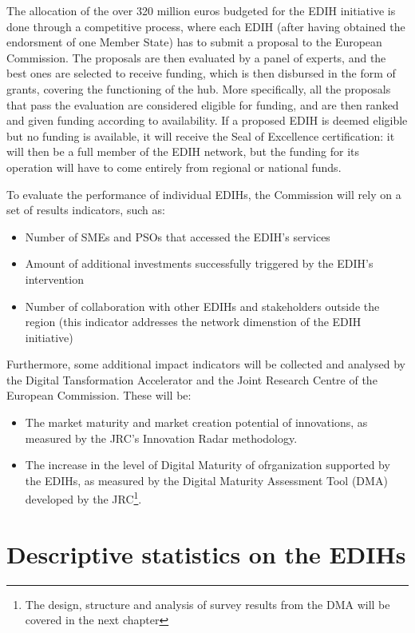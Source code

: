 \documentclass[12pt]{report}
\begin{document}
\par The allocation of the over 320 million euros budgeted for the EDIH initiative is done through a competitive process, where each EDIH (after having obtained the endorsment of one Member State) has to submit a proposal to the European Commission. The proposals are then evaluated by a panel of experts, and the best ones are selected to receive funding, which is then disbursed in the form of grants, covering the functioning of the hub. More specifically, all the proposals that pass the evaluation are considered eligible for funding, and are then ranked and given funding according to availability. If a proposed EDIH is deemed eligible but no funding is available, it will receive the Seal of Excellence certification: it will then be a full member of the EDIH network, but the funding for its operation will have to come entirely from regional or national funds.

\par To evaluate the performance of individual EDIHs, the Commission will rely on a set of results indicators, such as:
\begin{itemize}
    \item Number of SMEs and PSOs that accessed the EDIH's services
    \item Amount of additional investments successfully triggered by the EDIH's intervention
    \item Number of collaboration with other EDIHs and stakeholders outside the region (this indicator addresses the network dimenstion of the EDIH initiative)
\end{itemize}
\par Furthermore, some additional impact indicators will be collected and analysed by the Digital Tansformation Accelerator and the Joint Research Centre of the European Commission. These will be:
\begin{itemize}
    \item The market maturity and market creation potential of innovations, as measured by the JRC's Innovation Radar methodology.
    \item The increase in the level of Digital Maturity of ofrganization supported by the EDIHs, as measured by the Digital Maturity Assessment Tool (DMA) developed by the JRC\footnote{The design, structure and analysis of survey results from the DMA will be covered in the next chapter}.
\end{itemize}

\section{Descriptive statistics on the EDIHs}
\end{document}

